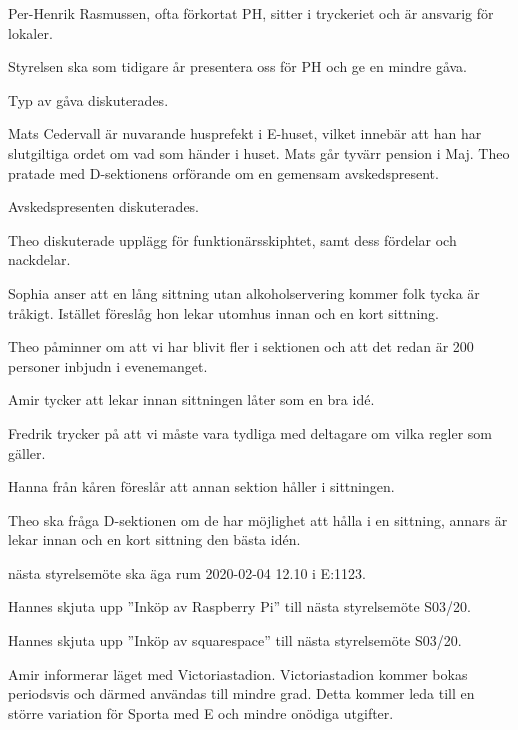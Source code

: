 \documentclass[10pt]{article}
\begin{document}
\begin{paragrafer}
Per-Henrik Rasmussen, ofta förkortat PH, sitter i tryckeriet och är ansvarig för lokaler.

Styrelsen ska som tidigare år presentera oss för PH och ge en mindre gåva.

Typ av gåva diskuterades.

Mats Cedervall är nuvarande husprefekt i E-huset, vilket innebär att han har slutgiltiga ordet om vad som händer i huset.
Mats går tyvärr pension i Maj.
Theo pratade med D-sektionens orförande om en gemensam avskedspresent.

Avskedspresenten diskuterades.


Theo diskuterade upplägg för funktionärsskiphtet, samt dess fördelar och nackdelar.

Sophia anser att en lång sittning utan alkoholservering kommer folk tycka är tråkigt. Istället föreslåg hon lekar utomhus innan och en kort sittning.

Theo påminner om att vi har blivit fler i sektionen och att det redan är 200 personer inbjudn i evenemanget.

Amir tycker att lekar innan sittningen låter som en bra idé.

Fredrik trycker på att vi måste vara tydliga med deltagare om vilka regler som gäller.

Hanna från kåren föreslår att annan sektion håller i sittningen.

Theo ska fråga D-sektionen om de har möjlighet att hålla i en sittning, annars är lekar innan och en kort sittning den bästa idén.


\Mba nästa styrelsemöte ska äga rum 2020-02-04 12.10 i E:1123.


Hannes \ypa skjuta upp ''Inköp av Raspberry Pi'' till nästa styrelsemöte S03/20.

\Mbaby 

Hannes \ypa skjuta upp ''Inköp av squarespace'' till nästa styrelsemöte S03/20.

\Mbaby 


Amir informerar läget med Victoriastadion. Victoriastadion kommer bokas periodsvis och därmed användas till mindre grad. Detta kommer leda till en större variation för Sporta med E och mindre onödiga utgifter.


\end{paragrafer}
\end{document}
